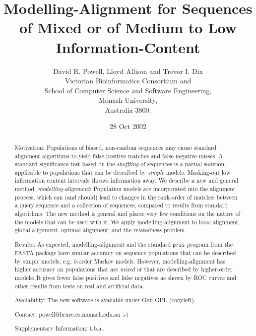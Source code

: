 \documentclass[letterpaper,11pt,oneside]{article}
\begin{document}
\title{ Modelling-Alignment for Sequences of Mixed or
of Medium to Low Information-Content }

\author{
  David R. Powell, Lloyd Allison and Trevor I. Dix \\
  Victorian Bioinformatics Consortium and \\
  School of Computer Science and Software Engineering, \\
  Monash University, \\
  Australia 3800.
}

\date{28 Oct 2002}
\maketitle



\begin{abstract}

\noindent
Motivation:
Populations of biased, non-random sequences may cause standard alignment
algorithms to yield false-positive matches and false-negative misses.
A standard significance test based on the {\em shuffling} of
sequences is a partial solution, applicable to populations that can
be described by {\em simple} models.
Masking-out low information content intervals throws information away.
We describe a new and general method, {\em modelling-alignment}:
Population models are incorporated into the alignment process,
which can (and should) lead to changes in the rank-order of matches
between a query sequence and a collection of sequences,
compared to results from standard algorithms.
The new method is general and places very few conditions on
the nature of the models that can be used with it.
We apply modelling-alignment to local alignment, global alignment,
optimal alignment, and the relatedness problem.

\noindent
Results:
As expected, modelling-alignment and the standard {\tt prss} program from
the FASTA package have similar accuracy on sequence populations that
can be described by simple models, e.g. 0-order Markov models.
However, modelling-alignment has higher accuracy on populations
that are {\em mixed} or that are described by higher-order models:
It gives fewer false positives and false negatives as shown by
ROC curves and other results from tests on
real and artificial data.

\noindent
Availability:
The new software is available under Gnu GPL (copyleft).

\noindent
Contact:
powell@bruce.cs.monash.edu.au :-)

\noindent
Supplementary Information:
t.b.a..

\end{abstract}
\end{document}
